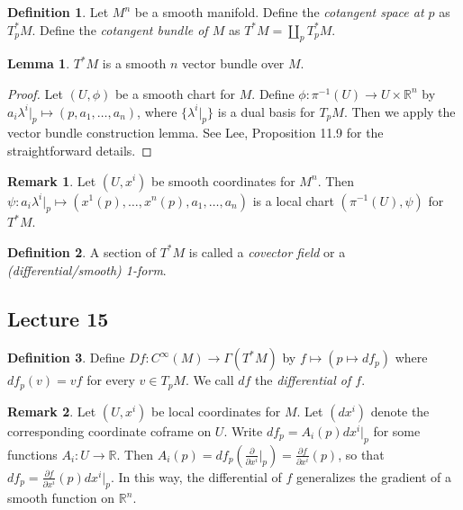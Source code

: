 \documentclass[10pt,letterpaper,cm]{nupset}
\theoremstyle{definition}
\newtheorem*{definition}{Definition}
\newtheorem{remark}{Remark}
\newtheorem{lemma}{Lemma}
\newcommand{\R}{\mathbb R}
\newcommand{\1}{\mathbf{1}}
\newcommand{\0}{\vec 0}
\begin{document}
\begin{definition}
Let $M^n$ be a smooth manifold. Define the \textit{cotangent space at $p$} as $T_p^{\ast}M$. Define the \textit{cotangent bundle of $M$} as $T^{\ast}M = \coprod_p T_p^{\ast}M$.
\end{definition}

\begin{lemma}
$T^{\ast}M$ is a smooth $n$ vector bundle over $M$.
\end{lemma}
\begin{proof}
Let $(U, \phi)$ be a smooth chart for $M$. Define $\phi : \pi^{-1}(U) \to U \times \R^n$ by $a_i \lambda^i\rvert_p \mapsto (p, a_1, \ldots, a_n)$, where $\{\lambda^i \rvert_p\}$ is a dual basis for $T_pM$. Then we apply the vector bundle construction lemma. See Lee, Proposition 11.9 for the straightforward details.
\end{proof}

\begin{remark}
Let $(U, x^i)$ be smooth coordinates for $M^n$. Then $\psi: a_i\lambda^i\rvert_p \mapsto (x^1(p), \ldots, x^n(p), a_1, \ldots, a_n)$ is a local chart $(\pi^{-1}(U), \psi)$ for $T^{\ast}M$.
\end{remark}

\begin{definition}
A section of $T^{\ast}M$ is called a \textit{covector field} or a \textit{(differential/smooth) 1-form}.
\end{definition}

\subsection{Lecture 15}

\begin{definition}
Define $Df : C^{\infty}(M) \to \Gamma(T^{\ast}M)$ by $f \mapsto (p\mapsto df_p)$ where $df_p(v) = vf$ for every $v\in T_pM$. We call $df$ the \textit{differential of $f$}.
\end{definition}

\begin{remark}
Let $(U, x^i)$ be local coordinates for $M$. Let $(dx^i)$ denote the corresponding coordinate coframe on $U$. Write $df_p = A_i(p)dx^i\rvert_p$ for some functions $A_i : U \to \R$. Then $A_i(p) = df_p(\frac{\partial}{\partial{x^i}}\rvert_p) = \frac{\partial{f}}{\partial{x^i}}(p)$, so that $df_p = \frac{\partial{f}}{\partial{x^i}}(p) dx^i\rvert_p$. In this way, the differential of $f$ generalizes the gradient of a smooth function on $\R^n$.
\end{remark}
\end{document}
